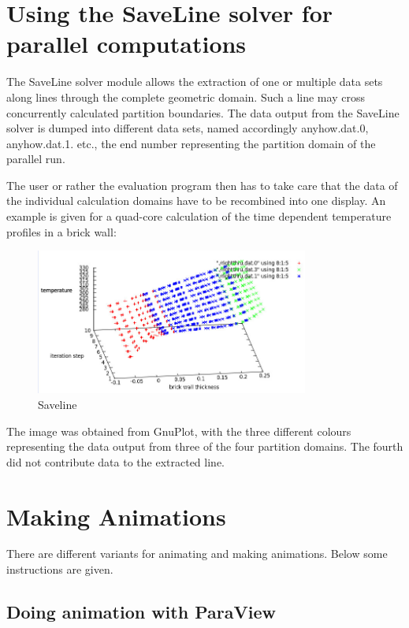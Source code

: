 \section{Using the SaveLine solver for parallel computations}

The SaveLine solver module allows the extraction of one or multiple data sets along lines through the complete geometric domain. Such a line may cross concurrently calculated partition boundaries. The data output from the SaveLine solver is dumped into different data sets, named accordingly anyhow.dat.0, anyhow.dat.1. etc., the end number representing the partition domain of the parallel run.

The user or rather the evaluation program then has to take care that the data of the individual calculation domains have to be recombined into one display. An example is given for a quad-core calculation of the time dependent temperature profiles in a brick wall: 

\begin{figure}[H]
\centering
\includegraphics[width=0.8\textwidth]{Temp-Profile}
\caption{Saveline}\label{fg:saveline}
\end{figure}

The image was obtained from GnuPlot, with the three different colours representing the data output from three of the four partition domains. The fourth did not contribute data to the extracted line. 

\section{Making Animations}

There are different variants for animating and making animations. Below some instructions are given.

\subsection{Doing animation with ParaView}

